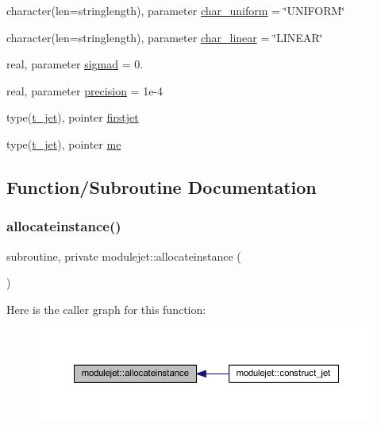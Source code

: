 \begin{DoxyCompactItemize}
\item 
character(len=stringlength), parameter \mbox{\hyperlink{namespacemodulejet_a712a0fb09e3bed71ec54b3f527cf6620}{char\+\_\+uniform}} = \char`\"{}U\+N\+I\+F\+O\+RM\char`\"{}
\item 
character(len=stringlength), parameter \mbox{\hyperlink{namespacemodulejet_a8e1524ba4bcb2d9dc829cb15187def34}{char\+\_\+linear}} = \char`\"{}L\+I\+N\+E\+AR\char`\"{}
\item 
real, parameter \mbox{\hyperlink{namespacemodulejet_a0d016ad4bb2860942a6dee0743ceb113}{sigmad}} = 0.
\item 
real, parameter \mbox{\hyperlink{namespacemodulejet_a1e044c780afebf2d2dbf72987f29c21c}{precision}} = 1e-\/4
\item 
type(\mbox{\hyperlink{structmodulejet_1_1t__jet}{t\+\_\+jet}}), pointer \mbox{\hyperlink{namespacemodulejet_a71f07968cb9db6433b4bf6e542b64236}{firstjet}}
\item 
type(\mbox{\hyperlink{structmodulejet_1_1t__jet}{t\+\_\+jet}}), pointer \mbox{\hyperlink{namespacemodulejet_ab55c2a250d5e25c16efdfeea48d0b3da}{me}}
\end{DoxyCompactItemize}


\subsection{Function/\+Subroutine Documentation}
\mbox{\label{namespacemodulejet_af21d1a641f05197da226314abaeccf5e}} 
\subsubsection{\texorpdfstring{allocateinstance()}{allocateinstance()}}
{\footnotesize\ttfamily subroutine, private modulejet\+::allocateinstance (\begin{DoxyParamCaption}{ }\end{DoxyParamCaption})\hspace{0.3cm}{\ttfamily [private]}}

Here is the caller graph for this function\+:\nopagebreak
\begin{figure}[H]
\begin{center}
\leavevmode
\includegraphics[width=350pt]{namespacemodulejet_af21d1a641f05197da226314abaeccf5e_icgraph}
\end{center}
\end{figure}
\mbox{\label{namespacemodulejet_a188ea99d96436b044d3ea76f4ddfa467}} 
